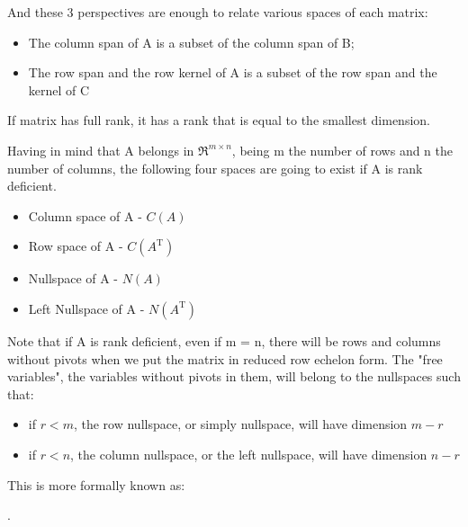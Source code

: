 \documentclass[12pt, a4paper]{article}
\begin{document}
\par And these 3 perspectives are enough to relate various spaces of each matrix:
\begin{itemize}
    \item The column span of A is a subset of the column span of B;
    \item The row span and the row kernel of A is a subset of the row span and the kernel of C
\end{itemize}


\vspace{.5cm}


If matrix has full rank, it has a rank that is equal to the smallest dimension.

Having in mind that A belongs in $\Re^{m\times n}$, being m the number of rows and n the number of columns, the following four spaces are going to exist if A is rank deficient.
\begin{itemize}
    \item Column space of A - $C(A)$
    \item Row space of A - $C(A^\text{T})$
    \item Nullspace of A - $N(A)$
    \item Left Nullspace of A - $N(A^\text{T})$
\end{itemize}

\Vhrulefill
\par Note that if A is rank deficient, even if m = n, there will be rows and columns without pivots when we put the matrix in reduced row echelon form. The "free variables", the variables without pivots in them, will belong to the nullspaces such that: 
\begin{itemize}
    \item if $r < m$, the row nullspace, or simply nullspace, will have dimension $m-r$
    \item if $r < n$, the column nullspace, or the left nullspace, will have dimension $n-r$
\end{itemize}
\Vhrulefill

This is more formally known as:
\begin{center}
    .    
\end{center}








\vspace{1cm}
\end{document}
